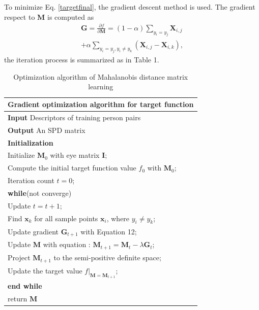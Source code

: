 \documentclass[10pt,twocolumn,letterpaper]{article}
\begin{document}
 To minimize Eq. \eqref{targetfinal}, the gradient descent method is used. The gradient respect to $\bm{M}$ is computed as
 \begin{equation}
 \begin{aligned}
 \bm{G} =\frac{\partial f}{\partial \bm{M}} = (1-\alpha) \sum_{y_i = y_j} \bm{X}_{i,j} \\
 + \alpha \sum_{y_i = y_j, y_i \ne y_k}(\bm{X}_{i,j} - \bm{X}_{i,k}),
 \end{aligned}
 \end{equation}
the iteration process is summarized as in Table 1.
 \begin{table}[H]
 \centering
 \caption{Optimization algorithm of Mahalanobis distance matrix learning}
 \label{Gradientdemo}
 \begin{tabular}{l}
 \hline 
 \multicolumn{1}{l}{\textbf{Gradient optimization algorithm for target function}} \\
 \hline
 \textbf{Input} Descriptors of training person pairs \\
 \textbf{Output} An SPD matrix\\
 \textbf{Initialization} \\
 Initialize $\bm{M}_0$ with eye matrix $\bm{I}$; \\
 Compute the initial target function value $f_0$ with $\bm{M}_0$;\\
 Iteration count  $t = 0$;\\

 \textbf{while}(not converge)\\
 \hspace{0.5cm} Update $t =  t + 1$;\\
 \hspace{0.5cm}  Find $\bm{x}_k$ for all sample points $\bm{x}_i$, where $y_i \ne y_k$;\\
 \hspace{0.5cm} Update gradient $\bm{G}_{t+1}$ with Equation 12;\\
 \hspace{0.5cm}  Update $\bm{M}$ with equation : $\bm{M}_{t+1} = \bm{M}_{t} - \lambda\bm{G}_t$;\\
 \hspace{0.5cm}  Project $\bm{M}_{t+1}$ to the semi-positive definite space; \\ 
 \hspace{0.5cm}  Update the target value $f|_{\bm{M} = \bm{M}_{t+1}}$;\\
 \textbf{end while}  \\
 return $\bm{M}$\\
 \hline
 \end{tabular} 
 \end{table}
 
\end{document}
